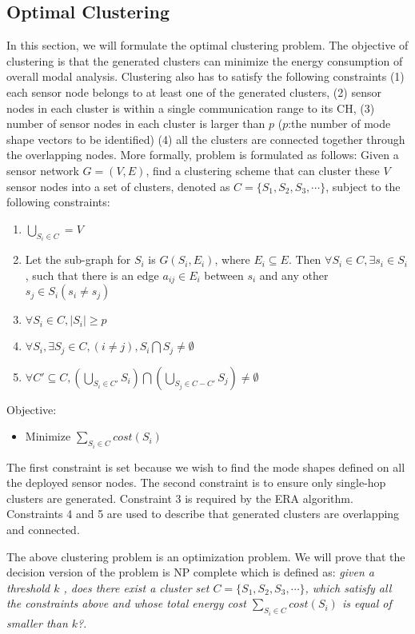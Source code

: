 \subsection{Optimal Clustering}
\label{sec:OptimalClustering}
In this section, we will formulate the optimal clustering problem.  The objective of clustering is that the generated clusters can minimize the energy consumption of overall modal analysis. Clustering also has to satisfy the following constraints (1) each sensor node belongs to at least one of the generated clusters, (2) sensor nodes in each cluster is within a single communication range to its CH, (3) number of sensor nodes in each cluster is larger than \(p\) (\(p\):the number of mode shape vectors to be identified) (4) all the clusters are connected together through the overlapping nodes. More formally, problem is formulated as follows:
Given a sensor network \(G=(V,E)\), find a clustering scheme that can cluster these \(V\) sensor nodes into a set of clusters, denoted as \(C=\{S_1, S_2, S_3, \cdots\}\), subject to the following constraints:
\begin{enumerate}
	\item \( \bigcup\limits_{S_i \in C} = V\)
	\item Let the sub-graph for \(S_i\) is \(G(S_i,E_i)\), where \(E_i \subseteq E\). Then \(\forall S_i \in C, \exists s_i \in S_i\), such that there is an edge \(a_{ij} \in E_i\) between \(s_i\) and any other \(s_j \in S_i (s_i \neq s_j)\) 
	\item \(\forall S_i \in C, \left|S_i\right|\geq p\)
	\item \( \forall S_i, \exists S_j \in C, (i \neq j), S_i \bigcap S_j \neq \emptyset\)
	\item \(\forall C' \subseteq C, (\bigcup\limits_{S_i \in C'} S_i)\bigcap (\bigcup\limits_{S_j \in C-C'} S_j) \neq \emptyset \)
\end{enumerate}
Objective:
\begin{itemize}
\item Minimize \(\sum\limits_{S_i \in C} cost(S_i)\)
\end{itemize}

The first constraint is set because we wish to find the mode shapes defined on all the deployed sensor nodes. The second constraint is to ensure only single-hop clusters are generated. Constraint 3 is required by the ERA algorithm. Constraints 4 and 5 are used to describe that generated clusters are overlapping and connected. 

The above clustering problem is an optimization problem. We will prove that the decision version of the problem is NP complete which is defined as: \emph{given a threshold \(k\) , does there exist a cluster set \(C=\{S_1, S_2, S_3, \cdots\}\), which satisfy all the constraints above and whose total energy cost \(\sum\limits_{S_i \in C} cost(S_i)\) is equal of smaller than \(k\)?}.

